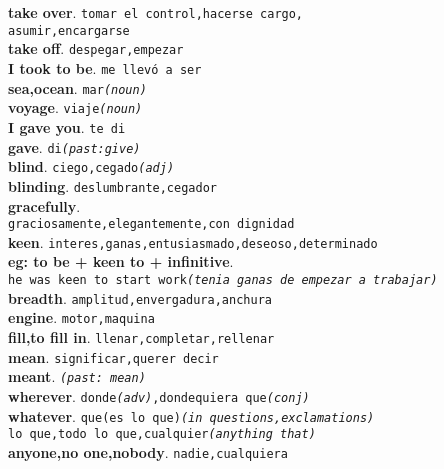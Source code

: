 \documentclass[twocolumn]{article}
\begin{document}
	\textsf{\textbf{take over}}. \texttt{tomar el control,hacerse cargo,\\asumir,encargarse}\\
	\textsf{\textbf{take off}}. \texttt{despegar,empezar}\\
	\textsf{\textbf{I took to be}}. \texttt{me llev\'o a ser}\\
	\textsf{\textbf{sea,ocean}}. \texttt{mar{\scriptsize \textsl{(noun)}}}\\
	\textsf{\textbf{voyage}}. \texttt{viaje{\scriptsize \textsl{(noun)}}}\\
	\textsf{\textbf{I gave you}}. \texttt{te di}\\
	\textsf{\textbf{gave}}. \texttt{di{\scriptsize \textsl{(past:give)}}}\\
	\textsf{\textbf{blind}}. \texttt{ciego,cegado{\scriptsize \textsl{(adj)}}}\\
	\textsf{\textbf{blinding}}. \texttt{deslumbrante,cegador}\\
	\textsf{\textbf{gracefully}}.\\\texttt{graciosamente,elegantemente,con dignidad}\\
	\textsf{\textbf{keen}}. \texttt{interes,ganas,entusiasmado,deseoso,determinado}\\
	{\scriptsize \textsf{\textbf{eg: to be + keen to + infinitive}}.\\
	\texttt{he was keen to start work{\scriptsize \textsl{(tenia ganas de empezar a trabajar)}}}}\\
	\textsf{\textbf{breadth}}. \texttt{amplitud,envergadura,anchura}\\
	\textsf{\textbf{engine}}. \texttt{motor,maquina}\\
	\textsf{\textbf{fill,to fill in}}. \texttt{llenar,completar,rellenar}\\
	\textsf{\textbf{mean}}. \texttt{significar,querer decir}\\
	\textsf{\textbf{meant}}. \texttt{{\scriptsize \textsl{(past: mean)}}}\\
	\textsf{\textbf{wherever}}. \texttt{donde{\scriptsize \textsl{(adv)}},dondequiera que{\scriptsize \textsl{(conj)}}}\\
	\textsf{\textbf{whatever}}. \texttt{que(es lo que){\scriptsize \textsl{(in questions,exclamations)}}\\
										         lo que,todo lo que,cualquier{\scriptsize \textsl{(anything that)}}}\\
	\textsf{\textbf{anyone,no one,nobody}}. \texttt{nadie,cualquiera}\\
\end{document}
